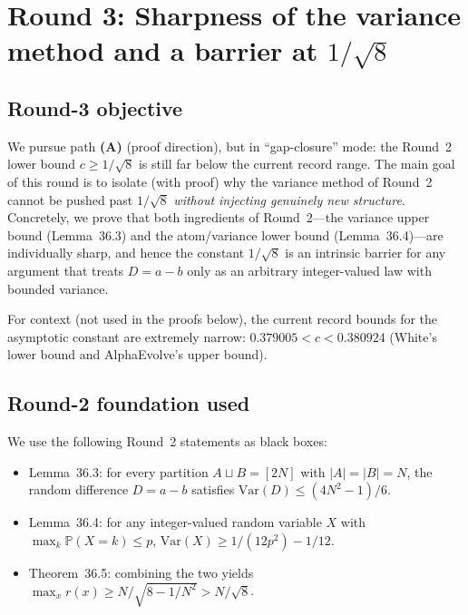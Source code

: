 \section{Round 3: Sharpness of the variance method and a barrier at $1/\sqrt 8$}

\subsection{Round-3 objective}
We pursue path \textbf{(A)} (proof direction), but in ``gap-closure'' mode: the Round~2 lower bound
\(c\ge 1/\sqrt 8\) is still far below the current record range.
The main goal of this round is to isolate (with proof) why the variance method of Round~2 cannot be
pushed past \(1/\sqrt 8\) \emph{without injecting genuinely new structure}.
Concretely, we prove that both ingredients of Round~2---the variance upper bound (Lemma~36.3) and the atom/variance lower bound (Lemma~36.4)---are individually sharp, and hence the constant \(1/\sqrt 8\) is an intrinsic barrier for any argument that treats \(D=a-b\) only as an arbitrary integer-valued law with bounded variance.

For context (not used in the proofs below), the current record bounds for the asymptotic constant are extremely narrow:
\(0.379005 < c < 0.380924\) (White's lower bound and AlphaEvolve's upper bound).

\subsection{Round-2 foundation used}
We use the following Round~2 statements as black boxes:
\begin{itemize}
\item Lemma~36.3: for every partition \(A\sqcup B=[2N]\) with \(|A|=|B|=N\), the random difference \(D=a-b\) satisfies
\(\mathrm{Var}(D)\le (4N^2-1)/6\).
\item Lemma~36.4: for any integer-valued random variable \(X\) with \(\max_k \mathbb P(X=k)\le p\),
\(\mathrm{Var}(X)\ge 1/(12p^2)-1/12\).
\item Theorem~36.5: combining the two yields
\(\max_x r(x)\ge N/\sqrt{8-1/N^2}>N/\sqrt 8\).
\end{itemize}

